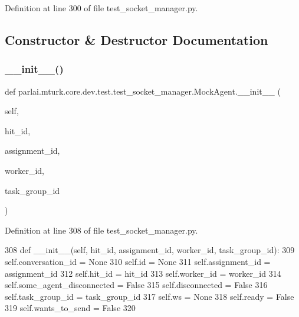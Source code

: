 Definition at line 300 of file test\+\_\+socket\+\_\+manager.\+py.



\subsection{Constructor \& Destructor Documentation}
\mbox{\label{classparlai_1_1mturk_1_1core_1_1dev_1_1test_1_1test__socket__manager_1_1MockAgent_a485fec8967608a1c95fabee6bfe7873a}} 
\subsubsection{\texorpdfstring{\+\_\+\+\_\+init\+\_\+\+\_\+()}{\_\_init\_\_()}}
{\footnotesize\ttfamily def parlai.\+mturk.\+core.\+dev.\+test.\+test\+\_\+socket\+\_\+manager.\+Mock\+Agent.\+\_\+\+\_\+init\+\_\+\+\_\+ (\begin{DoxyParamCaption}\item[{}]{self,  }\item[{}]{hit\+\_\+id,  }\item[{}]{assignment\+\_\+id,  }\item[{}]{worker\+\_\+id,  }\item[{}]{task\+\_\+group\+\_\+id }\end{DoxyParamCaption})}



Definition at line 308 of file test\+\_\+socket\+\_\+manager.\+py.


\begin{DoxyCode}
308     \textcolor{keyword}{def }\_\_init\_\_(self, hit\_id, assignment\_id, worker\_id, task\_group\_id):
309         self.conversation\_id = \textcolor{keywordtype}{None}
310         self.id = \textcolor{keywordtype}{None}
311         self.assignment\_id = assignment\_id
312         self.hit\_id = hit\_id
313         self.worker\_id = worker\_id
314         self.some\_agent\_disconnected = \textcolor{keyword}{False}
315         self.disconnected = \textcolor{keyword}{False}
316         self.task\_group\_id = task\_group\_id
317         self.ws = \textcolor{keywordtype}{None}
318         self.ready = \textcolor{keyword}{False}
319         self.wants\_to\_send = \textcolor{keyword}{False}
320 
\end{DoxyCode}


